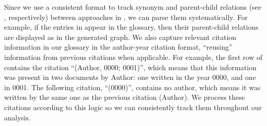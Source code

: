     Since we use a consistent format to track synonym and parent-child
    relations (see , respectively)
    between approaches in \ourApproachGlossary{}, we can parse them
    systematically. For example, if the entries in 
    appear in the glossary, then their parent-child relations are displayed as
     in the generated graph. We also capture relevant
    citation information in our glossary in the author-year citation format,
    ``reusing'' information from previous citations when applicable.
    For example, the first row of 
    contains the citation ``(Author, 0000; 0001)'', which means that this
    information was present in two documents by Author: one written in
    the year 0000, and one in 0001. The following citation, ``(0000)'',
    contains no author, which means it was written by the same one as the
    previous citation (Author). We process these citations according to this
    logic  so we can
    consistently track them throughout our analysis.

    

    \ExampleGraph{}

